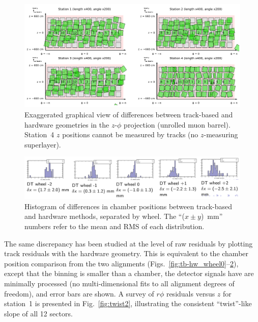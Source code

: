 \documentclass[12pt]{article}
\begin{document}
\begin{figure}
\includegraphics[width=\linewidth]{twist3.png}
\caption{Exaggerated graphical view of differences between track-based
  and hardware geometries in the $z$-$\phi$ projection (unrolled muon
  barrel).  Station~4 $z$ positions cannot be measured by tracks (no
  $z$-measuring superlayer). \label{fig:twist3}}
\end{figure}

\begin{figure}
\includegraphics[width=\linewidth]{twist1.png}
\caption{Histogram of differences in chamber positions between
  track-based and hardware methods, separated by wheel.  The ``($x \pm
  y$)~mm'' numbers refer to the mean and RMS of each
  distribution. \label{fig:twist1}}
\end{figure}

The same discrepancy has been studied at the level of raw residuals by
plotting track residuals with the hardware geometry.  This is
equivalent to the chamber position comparison from the two alignments
(Figs.~\ref{fig:tb-hw_wheel0}--\ref{fig:twist1}), except that the
binning is smaller than a chamber, the detector signals have are
minimally processed (no multi-dimensional fits to all alignment
degrees of freedom), and error bars are shown.  A survey of $r\phi$
residuals versus $z$ for station~1 is presented in
Fig.~\ref{fig:twist2}, illustrating the consistent ``twist''-like
slope of all 12 sectors.
\end{document}
